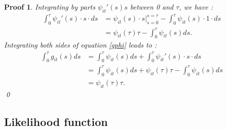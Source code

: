 \newtheorem*{proof2}{Proof}
\begin{proof2}
Integrating by parts $\psi_{it}'(s) s$ between 0 and $\tau$, we have :
\begin{align*}
    \int_0^{\tau}\psi_{it}'(s)\cdot s \cdot ds &= \psi_{it}(s) \cdot s|_{s=0}^{s=\tau} - \int_0^{\tau}\psi_{it}(s) \cdot 1 \cdot ds \\
    &= \psi_{it}(\tau) \tau - \int_0^{\tau}\psi_{it}(s) ds.
\end{align*}
Integrating both sides of equation \ref{gphi} leads to :
\begin{align*}
    \int_0^{\tau} g_{it}(s) ds &= \int_0^{\tau}\psi_{it}(s)ds + \int_0^{\tau}\psi_{it}'(s)\cdot s \cdot ds \\
    &= \int_0^{\tau}\psi_{it}(s)ds + \psi_{it}(\tau) \tau - \int_0^{\tau}\psi_{it}(s) ds \\
    &= \psi_{it}(\tau) \tau.
\end{align*} \qed
\end{proof2}

\subsection{Likelihood function}


